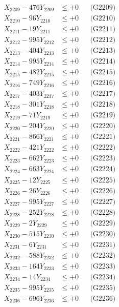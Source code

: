 \documentclass[a4paper,10pt]{article}
\begin{document}
{\begin{align}
X_{2209} - 476Y_{2209} &\leq +0 && \text{(G2209)} \\
X_{2210} - 96Y_{2210} &\leq +0 && \text{(G2210)} \\
\allowbreak
X_{2211} - 19Y_{2211} &\leq +0 && \text{(G2211)} \\
X_{2212} - 995Y_{2212} &\leq +0 && \text{(G2212)} \\
X_{2213} - 404Y_{2213} &\leq +0 && \text{(G2213)} \\
X_{2214} - 995Y_{2214} &\leq +0 && \text{(G2214)} \\
X_{2215} - 482Y_{2215} &\leq +0 && \text{(G2215)} \\
X_{2216} - 749Y_{2216} &\leq +0 && \text{(G2216)} \\
X_{2217} - 403Y_{2217} &\leq +0 && \text{(G2217)} \\
X_{2218} - 301Y_{2218} &\leq +0 && \text{(G2218)} \\
X_{2219} - 71Y_{2219} &\leq +0 && \text{(G2219)} \\
X_{2220} - 204Y_{2220} &\leq +0 && \text{(G2220)} \\
\allowbreak
X_{2221} - 866Y_{2221} &\leq +0 && \text{(G2221)} \\
X_{2222} - 421Y_{2222} &\leq +0 && \text{(G2222)} \\
X_{2223} - 662Y_{2223} &\leq +0 && \text{(G2223)} \\
X_{2224} - 663Y_{2224} &\leq +0 && \text{(G2224)} \\
X_{2225} - 12Y_{2225} &\leq +0 && \text{(G2225)} \\
X_{2226} - 26Y_{2226} &\leq +0 && \text{(G2226)} \\
X_{2227} - 995Y_{2227} &\leq +0 && \text{(G2227)} \\
X_{2228} - 252Y_{2228} &\leq +0 && \text{(G2228)} \\
X_{2229} - 2Y_{2229} &\leq +0 && \text{(G2229)} \\
X_{2230} - 515Y_{2230} &\leq +0 && \text{(G2230)} \\
\allowbreak
X_{2231} - 6Y_{2231} &\leq +0 && \text{(G2231)} \\
X_{2232} - 588Y_{2232} &\leq +0 && \text{(G2232)} \\
X_{2233} - 164Y_{2233} &\leq +0 && \text{(G2233)} \\
X_{2234} - 14Y_{2234} &\leq +0 && \text{(G2234)} \\
X_{2235} - 995Y_{2235} &\leq +0 && \text{(G2235)} \\
X_{2236} - 696Y_{2236} &\leq +0 && \text{(G2236)} \\

\end{align}}
\end{document}
